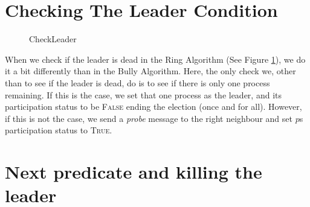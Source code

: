 \documentclass{report}
\begin{document}
\begin{calloutgreen}
\begin{calloutyellow}
\section{Checking The Leader Condition}
\begin{figure}
  \tlatex

\@x{}\moduleLeftDash{}\moduleRightDash\@xx{}%
%
%
%
%
%
%
%
%
\@xx{}%
\@x{}\bottombar\@xx{}%

  \caption{CheckLeader}
  \label{ringcheckleader}
  \end{figure}


When we check if the leader is dead in the Ring Algorithm (See Figure \ref{ringcheckleader}), we do it a bit differently than in the Bully Algorithm. Here, the only check we, other than to see if the leader is dead, do is to see if there is only one process remaining. If this is the case, we set that one process as the leader, and its participation status to be \textsc{False} ending the election (once and for all). However, if this is not the case, we send a \textit{probe} message to the right neighbour and set $p$s participation status to \textsc{True}.

\section{Next predicate and killing the leader}

\begin{figure}
\tlatex
\@x{}\moduleLeftDash{}\moduleRightDash\@xx{}%
%
%
\@pvspace{8.0pt}%
%
\@x{}\bottombar\@xx{}%


\end{figure}
\end{calloutyellow}
\end{calloutgreen}
\end{document}
